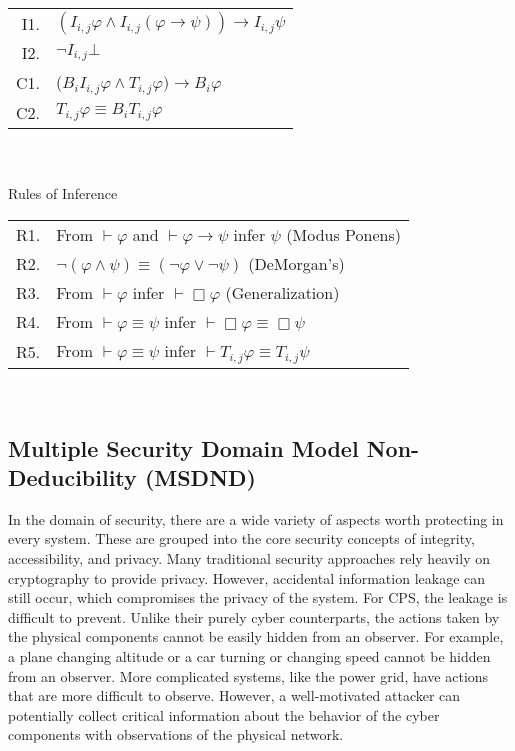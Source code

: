 \begin{table}[!t]
\begin{tabular}{r l}
I1. & $(I_{i,j} \varphi \wedge I_{i,j} (\varphi \rightarrow \psi )) \rightarrow I_{i,j} \psi$\\
I2. & $\neg I_{i,j} \bot$ \\
C1. & ($B_i I_{i,j} \varphi \wedge T_{i,j} \varphi) \rightarrow B_i \varphi$ \\
C2. & $T_{i,j} \varphi \equiv B_i T_{i,j} \varphi$ \\
\end{tabular} \\~\\
Rules of Inference \\
\begin{tabular}{r l}
R1. & From $\vdash \varphi$ and $\vdash \varphi \rightarrow \psi$ infer $\psi$ (Modus Ponens) \\
R2. & $\neg (\varphi \wedge \psi) \equiv (\neg \varphi \vee \neg \psi)$ (DeMorgan's)\\
R3. & From $\vdash \varphi$ infer $\vdash \Box \varphi$ (Generalization)\\
R4. & From $\vdash \varphi \equiv \psi$ infer $\vdash \Box \varphi \equiv \Box \psi$\\
R5. & From $\vdash \varphi \equiv \psi$ infer $\vdash T_{i,j} \varphi \equiv T_{i,j} \psi$\\
\end{tabular} \\
\label{tab:axiomatic}
\end{table}

\subsection{Multiple Security Domain Model Non-Deducibility (MSDND)}

In the domain of security, there are a wide variety of aspects worth protecting in every system.
These are grouped into the core security concepts of integrity, accessibility, and privacy.
Many traditional security approaches rely heavily on cryptography to provide privacy.
However, accidental information leakage can still occur, which compromises the privacy of the system.
For \ac{CPS}, the leakage is difficult to prevent.
Unlike their purely cyber counterparts, the actions taken by the physical components cannot be easily hidden from an observer.
For example, a plane changing altitude or a car turning or changing speed cannot be hidden from an observer.
More complicated systems, like the power grid, have actions that are more difficult to observe.
However, a well-motivated attacker can potentially collect critical information about the behavior of the cyber components with observations of the physical network\cite{Roth2012}.

